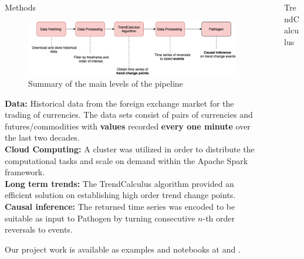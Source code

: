 \documentclass[final]{beamer}
\newlength{\sepwidth}
\newlength{\colwidth}
\newcommand{\separatorcolumn}{\begin{column}{\sepwidth}\end{column}}
\begin{document}
\begin{frame}[fragile]
\begin{columns}[t]
\begin{column}{\colwidth}
    \begin{block}{Methods}
      \vspace{0.6in}
      \begin{figure}
         \centering
         \includegraphics[width=1\textwidth]{Pipeline.png}
         \caption{Summary of the main levels of the pipeline}
         \label{fig:my_label}
      \end{figure}
      \textsf{\textbf{Data:}} Historical data from the foreign exchange market for the trading of currencies. The data sets consist of pairs of currencies and futures/commodities with \textsf{\textbf{values}} recorded \textsf{\textbf{every one minute}} over the last two decades.\\
      \vspace{0.6in}
      \textsf{\textbf{Cloud Computing:}} A cluster was utilized in order to distribute the computational tasks and scale on demand within the Apache Spark framework.\\
      \vspace{0.6in}
      \textsf{\textbf{Long term trends:}} The TrendCalculus algorithm provided an efficient solution on establishing high order trend change points.\\
      \vspace{0.6in}
      \textsf{\textbf{Causal inference:}} The returned time series was encoded to be suitable as input to Pathogen by turning consecutive  $n$-th order reversals to events.\\
     \end{block}
    \vspace{0.5in}
    
     \begin{alertblock}{}
      Our project work is available as examples and notebooks at \cite{TrendCalculusNotebooks} and \cite{PathogenNotebooks}.  
     \end{alertblock}

\end{column}

\separatorcolumn



\begin{column}{\colwidth}
    \begin{block}{TrendCalculus}
        

\end{block}
\end{column}
\end{columns}
\end{frame}
\end{document}
